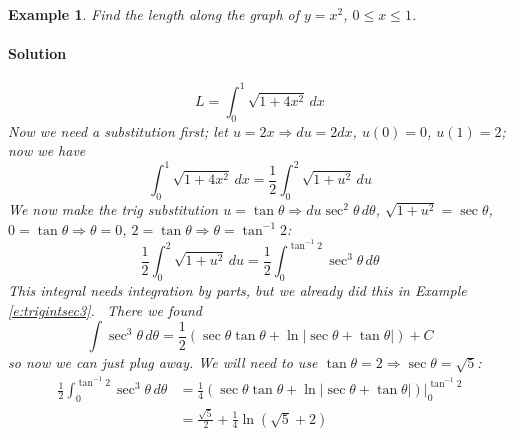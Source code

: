 \documentclass[letterpaper, 11pt, openany]{book}
\theoremstyle{mytheoremstyle}
\theoremstyle{myexamplestyle}
\newtheorem{example}{Example}[section]
\newenvironment{solution}{\paragraph{\sffamily \smaller \fontseries{b}\selectfont Solution}}{\hfill\faSquare}
\begin{document}
\begin{example}\label{e:trig-sub-arclen}
    Find the length along the graph of $y = x^{2}$, $0 \leq x \leq 1$.
    
    \begin{solution}
        \[L = \int_{0}^{1} \sqrt{1 + 4x^{2}} \, dx \]
        Now we need a substitution first; let $u = 2x \Rightarrow du = 2dx$, $u(0) = 0$, $u(1) = 2$; now we have
        \[\int_{0}^{1} \sqrt{1 + 4x^{2}} \, dx = \frac{1}{2} \int_{0}^{2} \sqrt{1 + u^{2}}\, du\]
        We now make the trig substitution $u = \tan \theta \Rightarrow du \sec^{2} \theta \, d\theta$, $\sqrt{1+u^{2}} = \sec \theta$, $0 = \tan \theta \Rightarrow \theta = 0$, $2 = \tan \theta \Rightarrow \theta = \tan^{-1} 2$:
        \[\frac{1}{2} \int_{0}^{2} \sqrt{1 + u^{2}}\, du = \frac{1}{2} \int_{0}^{\tan^{-1} 2} \sec^{3} \theta \, d\theta\]
        This integral needs integration by parts, but we already did this in Example \ref{e:trigintsec3}. \faSmile \ There we found
        \[\int \sec^{3}\theta \, d\theta = \frac{1}{2}\left(\sec \theta \tan \theta + \ln | \sec \theta + \tan \theta | \right) + C\]
        so now we can just plug away. We will need to use $\tan \theta = 2 \Rightarrow \sec \theta = \sqrt{5}$:
        \begin{align*}
            \frac{1}{2} \int_{0}^{\tan^{-1} 2} \sec^{3} \theta \, d\theta &= \frac{1}{4} \left( \sec \theta \tan \theta + \ln | \sec \theta + \tan \theta | \right)\bigg|_{0}^{\tan^{-1} 2} \\
            &= \frac{\sqrt{5}}{2} + \frac{1}{4}\ln\left( \sqrt{5} + 2 \right)
        \end{align*}
    \end{solution}
\end{example}
\end{document}
